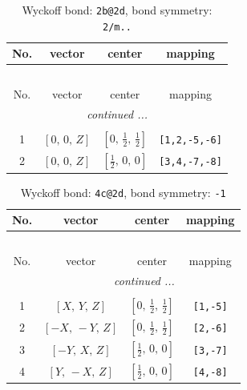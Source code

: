 \documentclass[fleqn,8pt]{jsarticle}
\begin{document}
\renewcommand{\arraystretch}{1.2}
\begin{longtable}{cccc}
\caption{Wyckoff bond: {\tt 2b@2d}, bond symmetry: {\tt 2/m..}}
 \\
 \hline \hline
No. & vector & center & mapping \\ \hline \endfirsthead

\multicolumn{3}{l}{\tablename\ \thetable{}} \\
 \hline \hline
No. & vector & center & mapping \\ \hline \endhead

 \hline \hline
\multicolumn{3}{r}{\footnotesize\it continued ...} \\ \endfoot

 \hline \hline
\multicolumn{3}{r}{} \\ \endlastfoot

1 & $\left[ 0,\, 0,\, Z \right]$ & $\left[ 0,\, \frac{1}{2},\, \frac{1}{2} \right]$ & {\tt [1,2,-5,-6]} \\ \hline
2 & $\left[ 0,\, 0,\, Z \right]$ & $\left[ \frac{1}{2},\, 0,\, 0 \right]$ & {\tt [3,4,-7,-8]} \\
\end{longtable}
\renewcommand{\arraystretch}{1.2}
\begin{longtable}{cccc}
\caption{Wyckoff bond: {\tt 4c@2d}, bond symmetry: {\tt -1}}
 \\
 \hline \hline
No. & vector & center & mapping \\ \hline \endfirsthead

\multicolumn{3}{l}{\tablename\ \thetable{}} \\
 \hline \hline
No. & vector & center & mapping \\ \hline \endhead

 \hline \hline
\multicolumn{3}{r}{\footnotesize\it continued ...} \\ \endfoot

 \hline \hline
\multicolumn{3}{r}{} \\ \endlastfoot

1 & $\left[ X,\, Y,\, Z \right]$ & $\left[ 0,\, \frac{1}{2},\, \frac{1}{2} \right]$ & {\tt [1,-5]} \\ \hline
2 & $\left[ - X,\, - Y,\, Z \right]$ & $\left[ 0,\, \frac{1}{2},\, \frac{1}{2} \right]$ & {\tt [2,-6]} \\ \hline
3 & $\left[ - Y,\, X,\, Z \right]$ & $\left[ \frac{1}{2},\, 0,\, 0 \right]$ & {\tt [3,-7]} \\ \hline
4 & $\left[ Y,\, - X,\, Z \right]$ & $\left[ \frac{1}{2},\, 0,\, 0 \right]$ & {\tt [4,-8]} \\
\end{longtable}
\end{document}
